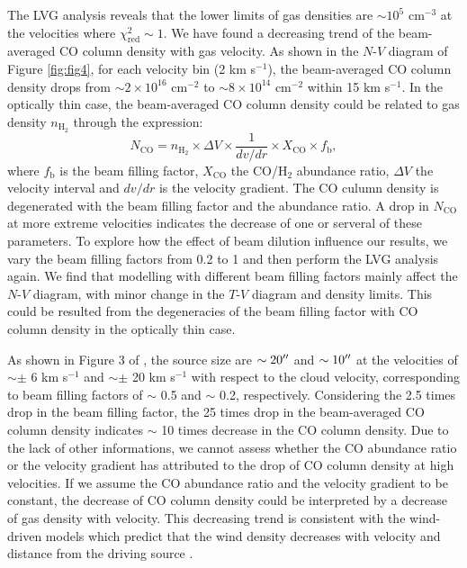 The LVG analysis reveals that the lower limits of gas densities are $\sim 10^5$ cm$^{-3}$ at the velocities where $\chi^2_{\mathrm{red}} \sim 1$. We have found a decreasing trend of the beam-averaged CO column density with gas velocity. As shown in the $N$-$V$ diagram of Figure \ref{fig:fig4}, for each velocity bin (2 km s$^{-1}$), the beam-averaged CO column density drops from $\sim 2 \times  10^{16} $ cm$^{-2}$ to $\sim 8 \times 10^{14}$ cm$^{-2}$ within 15 km s$^{-1}$. In the optically thin case, the beam-averaged CO column density could be related to gas density $n_{\mathrm{H}_2}$ through the expression: 
\begin{equation}
N_{\mathrm{CO}} = n_{\mathrm{H}_2} \times \Delta V \times \frac{1}{dv/dr} \times X_{\mathrm{CO}} \times f_{\mathrm{b}}, 
\end{equation}
where $f_{\mathrm{b}}$ is the beam filling factor, $X_{\mathrm{CO}}$ the CO/H$_2$ abundance ratio, $\Delta V$ the velocity interval and $dv/dr$ is the velocity gradient. The CO culumn density is degenerated with the beam filling factor and the abundance ratio. A drop in $N_{\mathrm{CO}}$ at more extreme velocities indicates the decrease of one or serveral of these parameters. 
To explore how the effect of beam dilution influence our results, we vary the beam filling factors from 0.2 to 1 and then perform the LVG analysis again. We find that modelling with different beam filling factors mainly affect the $N$-$V$ diagram, with minor change in the $T$-$V$ diagram and density limits. This could be resulted from the degeneracies of the beam filling factor with CO column density in the optically thin case. 

As shown in Figure 3 of \citet{2009ApJ...696...66Q}, the source size are $\sim 20\mbox{$^{\prime\prime}$}$ and $\sim 10\mbox{$^{\prime\prime}$}$ at the velocities of $\sim \pm$ 6 km s$^{-1}$ and $\sim \pm$ 20 km s$^{-1}$ with respect to the cloud velocity, corresponding to beam filling factors of $\sim$ 0.5 and $\sim$ 0.2, respectively. Considering the 2.5 times drop in the beam filling factor, the 25 times drop in the beam-averaged CO column density indicates $\sim$ 10 times decrease in the CO column density. Due to the lack of other informations, we cannot assess whether the CO abundance ratio or the velocity gradient has attributed to the drop of CO column density at high velocities. If we assume the CO abundance ratio and the velocity gradient to be constant, the decrease of CO column density could be interpreted by a decrease of gas density with velocity. This decreasing trend is consistent with the wind-driven models which predict that the wind density decreases with velocity and distance from the driving source \citep{2007prpl.conf..245A}.